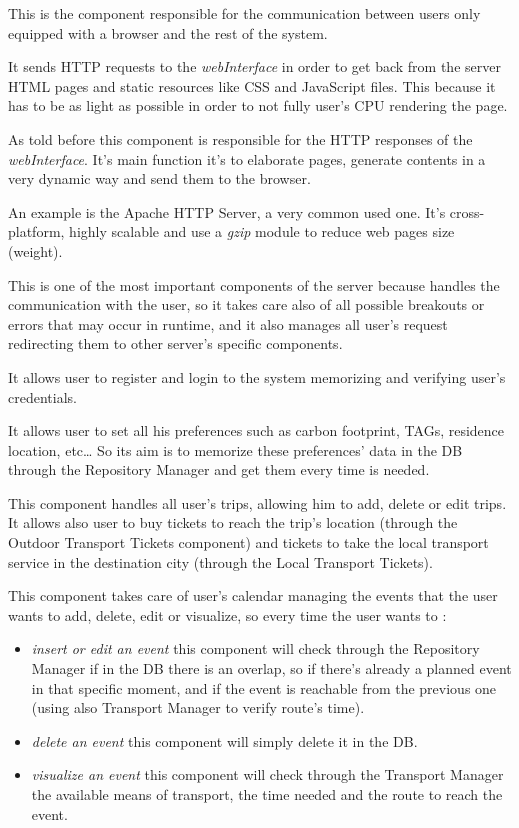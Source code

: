 This is the component responsible for the communication between users only equipped with a browser and the rest of the system.\par
It sends HTTP requests to the \emph{webInterface} in order to get back from the server HTML pages and static resources like CSS and JavaScript files. This because it has to be as light as possible in order to not fully user’s CPU rendering the page.

As told before this component is responsible for the HTTP responses of the \emph{webInterface}. It’s main function it’s to elaborate pages, generate contents in a very dynamic way and send them to the browser.\par
An example is the Apache HTTP Server, a very common used one. It’s cross-platform, highly scalable and use a \emph{gzip} module to reduce web pages size (weight).

This is one of the most important components of the server because handles the communication with the user, so it takes care also of all possible breakouts or errors that may occur in runtime, and it also manages all user’s request redirecting them to other server’s specific components.

It allows user to register and login to the system memorizing and verifying user’s credentials.

It allows user to set all his preferences such as carbon footprint, TAGs, residence location, etc… So its aim is to memorize these preferences’ data in the DB through the Repository Manager and get them every time is needed.

This component handles all user’s trips, allowing him to add, delete or edit trips. It allows also user to buy tickets to reach the trip’s location (through the Outdoor Transport Tickets component) and tickets to take the local transport service in the destination city (through the Local Transport Tickets).

This component takes care of user’s calendar managing the events that the user wants to add, delete, edit or visualize, so every time the user wants to :
\begin{itemize}
	\setlength{\leftskip}{1cm}
	\item \emph{insert or edit an event} this component will check through the Repository Manager if in the DB there is an overlap, so if there’s already a planned event in that specific moment, and if the event is reachable from the previous one (using also Transport Manager to verify route’s time).
	\item \emph{delete an event} this component will simply delete it in the DB.
	\item \emph{visualize an event} this component will check through the Transport Manager the available means of transport, the time needed and the route to reach the event.
\end{itemize}

